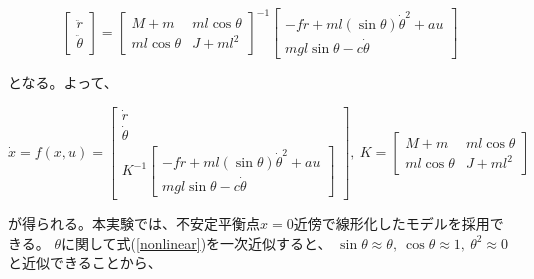 \documentclass[a4j,11pt,twoside]{jbook}
\begin{document}
$$
    \left[
    \begin{array}{c}
        \ddot r \\
        \ddot \theta
    \end{array}    
    \right]
    =
    \left[
    \begin{array}{cc}
        M + m          &  ml\cos \theta \\
        ml\cos \theta  &  J + ml^2
    \end{array}
    \right]^{-1}
    \left[
        \begin{array}{c}
            -f \dot r + ml(\sin \theta) \dot \theta^2 + au \\
            mgl\sin \theta - c \dot \theta
        \end{array}
    \right]
$$

となる。よって、

\begin{equation}
    \dot x = f(x, u) = 
    \left[
        \begin{array}{c}
            \dot r \\
            \dot \theta \\
            K^{-1}
            \left[
                \begin{array}{c}
                    -f \dot r + ml(\sin \theta) \dot \theta^2 + au \\
                    mgl\sin \theta - c \dot \theta
                \end{array}
            \right]
        \end{array}    
    \right],\
    K = 
    \left[
        \begin{array}{cc}
            M + m          &  ml\cos \theta \\
            ml\cos \theta  &  J + ml^2
        \end{array}
    \right]
    \label{nonlinear}
\end{equation}

が得られる。本実験では、不安定平衡点$x=0$近傍で線形化したモデルを採用できる。
$\theta$に関して式(\ref{nonlinear})を一次近似すると、
$\sin \theta \approx \theta,\ \cos \theta \approx 1,\ \theta^2 \approx 0$と近似できることから、
\end{document}
